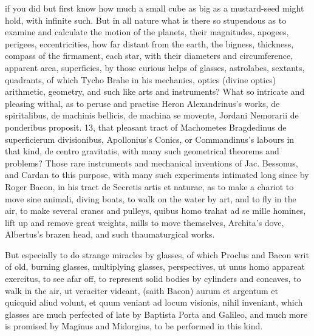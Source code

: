 {if you did but first know how much a small cube as big as a
mustard-seed might hold, with infinite such. But in all nature what is
there so stupendous as to examine and calculate the motion of the
planets, their magnitudes, apogees, perigees, eccentricities, how far
distant from the earth, the bigness, thickness, compass of the
firmament, each star, with their diameters and circumference, apparent
area, superficies, by those curious helps of glasses, astrolabes,
sextants, quadrants, of which Tycho Brahe in his mechanics, optics
(divine optics) arithmetic, geometry, and such like arts and
instruments? What so intricate and pleasing withal, as to peruse and
practise Heron Alexandrinus's works, de spiritalibus, de machinis
bellicis, de machina se movente, Jordani Nemorarii de ponderibus
proposit. 13, that pleasant tract of Machometes Bragdedinus de
superficierum divisionibus, Apollonius's Conics, or Commandinus's
labours in that kind, de centro gravitatis, with many such geometrical
theorems and problems? Those rare instruments and mechanical inventions
of Jac. Bessonus, and Cardan to this purpose, with many such
experiments intimated long since by Roger Bacon, in his tract de
Secretis artis et naturae, as to make a chariot to move sine
animali, diving boats, to walk on the water by art, and to fly in the
air, to make several cranes and pulleys, quibus homo trahat ad se mille
homines, lift up and remove great weights, mills to move themselves,
Archita's dove, Albertus's brazen head, and such thaumaturgical works.

But especially to do strange miracles by glasses, of which Proclus and
Bacon writ of old, burning glasses, multiplying glasses, perspectives,
ut unus homo appareat exercitus, to see afar off, to represent solid
bodies by cylinders and concaves, to walk in the air, ut veraciter
videant, (saith Bacon) aurum et argentum et quicquid aliud volunt, et
quum veniant ad locum visionis, nihil inveniant, which glasses are much
perfected of late by Baptista Porta and Galileo, and much more is
promised by Maginus and Midorgius, to be performed in this kind.

}
